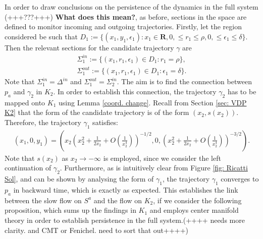 In order to draw conclusions on the persistence of the dynamics in the full system (+++???+++) \textbf{What does this mean?}, as before, sections in the space are defined to monitor incoming and outgoing trajectories.
Firstly, let the region considered be such that
$D_1:= \{ (x_1,y_1,\epsilon_1): x_1 \in \mathbf{R}, 0, \leq r_1 \leq \rho, 0, \leq\epsilon_1 \leq \delta\}$.
Then the relevant sections for the candidate trajectory $\gamma$ are
\begin{align*}
\Sigma^{in}_1 := \{ (x_1,r_1, \epsilon_1) \in D_1 : r_1 = \rho \}, \\
\Sigma^{out}_1 := \{ (x_1,r_1, \epsilon_1) \in D_1 : \epsilon_1=\delta \}.
\end{align*}
Note that $\Sigma^{in}_1 = \Delta^{in}$ and $\Sigma^{out}_1=\Sigma^{in}_2$.
The aim is to find the connection between $p_a$ and $\gamma_2$ in $K_2$. In order to establish this connection, the trajectory $\gamma_2$ has to be mapped onto $K_1$ using Lemma \ref{coord. change}. Recall from Section \ref{sec: VDP K2} that the form of the candidate trajectory is of the form $(x_2, s(x_2))$.
Therefore, the trajectory $\gamma_1$ satisfies:
\begin{align*}
(x_1, 0, y_1) = \left(x_2 \left(x_2^2 + \frac{1}{2x_2} + O\left(\frac{1}{x_2^4} \right) \right)^{-1/2}, 0, \left(x_2^2 + \frac{1}{2x_2} + O\left(\frac{1}{x_2^4} \right)\right)^{-3/2} \right).
\end{align*}
Note that $s(x_2)$ as $x_2 \to - \infty$ is employed, since we consider the left continuation of $\gamma_2$.
Furthermore, as is intuitively clear from Figure \ref{fig: Ricatti Sol}, and can be shown by analysing the form of $\gamma_1$, the trajectory $\gamma_1$ converges to $p_a$ in backward time, which is exactly as expected.
This establishes the link between the slow flow on $S^a$ and the flow on $K_2$, if we consider the following proposition, which sums up the findings in $K_1$ and employs center manifold theory in order to establish persistence in the full system.(++++ needs more clarity. and CMT or Fenichel. need to sort that out++++)
